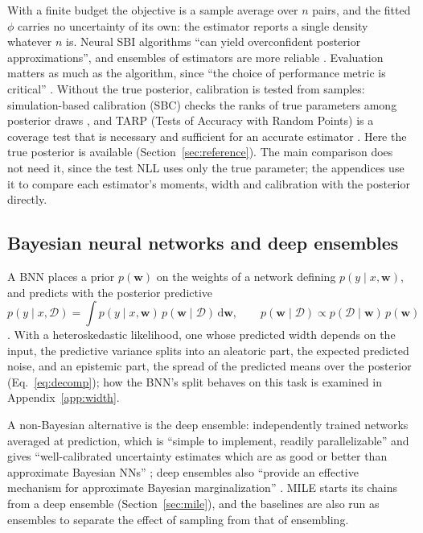 \documentclass[11pt]{article}
\begin{document}
With a finite budget the objective is a sample average over $n$ pairs, and the fitted $\phi$ carries no
uncertainty of its own: the estimator reports a single density whatever $n$ is. Neural SBI algorithms ``can yield
overconfident posterior approximations'', and ensembles of estimators are more reliable
\citep{hermans2022trust}. Evaluation matters as much as the algorithm, since ``the choice of performance metric is
critical'' \citep{lueckmann2021benchmark}. Without the true posterior, calibration is tested from samples:
simulation-based calibration (SBC) checks the ranks of true parameters among posterior draws \citep{talts2018sbc}, and
TARP (Tests of Accuracy with Random Points) is a coverage test that is necessary and sufficient for an accurate
estimator \citep{lemos2023tarp}. Here the true posterior is available (Section~\ref{sec:reference}). The main
comparison does not need it, since the test NLL uses only the true parameter; the appendices use it to compare each
estimator's moments, width and calibration with the posterior directly.

\subsection{Bayesian neural networks and deep ensembles}
\label{sec:bg_bnn}
A BNN places a prior $p(\mathbf w)$ on the weights of a network defining $p(y\mid x,\mathbf w)$, and predicts with
the posterior predictive
\begin{equation}
p(y\mid x,\mathcal{D})=\int p(y\mid x,\mathbf w)\,p(\mathbf w\mid\mathcal{D})\,\mathrm{d}\mathbf w,\qquad
p(\mathbf w\mid\mathcal{D})\propto p(\mathcal{D}\mid\mathbf w)\,p(\mathbf w)
\end{equation}
\citep{neal1996bayesian,mackay1992practical}. With a heteroskedastic likelihood, one whose predicted
width depends on the input, the predictive variance splits into an aleatoric part, the expected predicted noise, and an
epistemic part, the spread of the predicted means over the posterior (Eq.~\eqref{eq:decomp}); how the BNN's split behaves on this task is examined in
Appendix~\ref{app:width}.

A non-Bayesian alternative is the deep ensemble: independently trained networks averaged at prediction, which is
``simple to implement, readily parallelizable'' and gives ``well-calibrated uncertainty estimates which are as good
or better than approximate Bayesian NNs'' \citep{lakshminarayanan2017ensembles}; deep ensembles also ``provide an
effective mechanism for approximate Bayesian marginalization'' \citep{wilson2020bayesian}. MILE starts its chains from a deep
ensemble (Section~\ref{sec:mile}), and the baselines are also run as ensembles to separate the effect of sampling
from that of ensembling.
\end{document}
